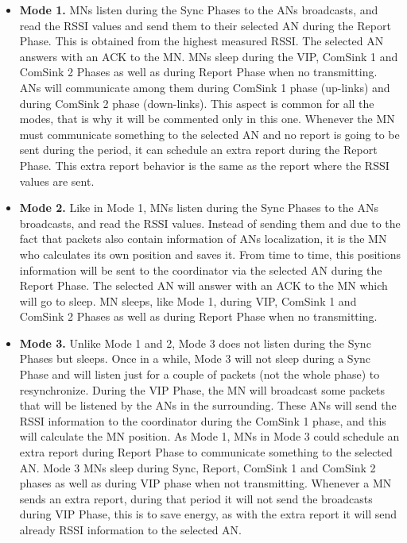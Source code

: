 \begin{itemize}
 \item \textbf{Mode 1.} \acp{MN} listen during the Sync Phases to the \acp{AN} broadcasts, and read the \ac{RSSI} values and send them
to their selected \ac{AN} during the Report Phase. This is obtained from the highest measured \ac{RSSI}. The selected \ac{AN} answers with an \ac{ACK} 
to the \ac{MN}. \acp{MN} sleep during the \ac{VIP}, ComSink 1 and ComSink 2 Phases as well as during Report Phase when no transmitting. 
\acp{AN} will communicate among them during ComSink 1 phase (up-links) and during ComSink 2 phase (down-links). This aspect is common for all the 
modes, that is why it will be commented only in this one. Whenever the \ac{MN} must communicate something to the selected \ac{AN} and no report 
is going to be sent during the period, it can schedule an extra report during the Report Phase. This extra report behavior is the same as the report 
where the \ac{RSSI} values are sent.
 
 \item \textbf{Mode 2.} Like in Mode 1, \acp{MN} listen during the Sync Phases to the \acp{AN} broadcasts, and read the \ac{RSSI} values. Instead
of sending them and due to the fact that packets also contain information of \acp{AN} localization, it is the \ac{MN} who calculates its own position 
and saves it. From time to time, this positions information will be sent to the coordinator via the selected \ac{AN} during the Report Phase. The 
selected \ac{AN} will answer with an \ac{ACK} to the \ac{MN} which will go to sleep. \ac{MN} sleeps, like Mode 1, during \ac{VIP}, ComSink 1 and ComSink 2 
Phases as well as during Report Phase when no transmitting.

 \item \textbf{Mode 3.} Unlike Mode 1 and 2, Mode 3 does not listen during the Sync Phases but sleeps. Once in a while, Mode 3 will not sleep during a 
Sync Phase and will listen just for a couple of packets (not the whole phase) to resynchronize. During the \ac{VIP} Phase, the \ac{MN} will broadcast
some packets that will be listened by the \acp{AN} in the surrounding. These \acp{AN} will send the \ac{RSSI} information to the coordinator during the 
ComSink 1 phase, and this will calculate the \ac{MN} position. As Mode 1, \acp{MN} in Mode 3 could schedule an extra report during Report Phase to
communicate something to the selected \ac{AN}. Mode 3 \acp{MN} sleep during Sync, Report, ComSink 1 and ComSink 2 phases as well as during \ac{VIP} phase
when not transmitting. Whenever a \ac{MN} sends an extra report, during that period it will not send the broadcasts during \ac{VIP} Phase, this is to 
save energy, as with the extra report it will send already \ac{RSSI} information to the selected \ac{AN}.


\end{itemize}
